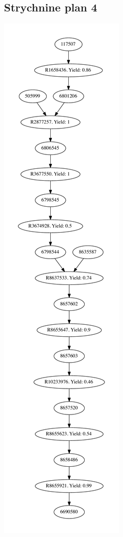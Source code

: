 \documentclass[a4paper,10pt,titlepage]{paper}
\begin{document}
\subsection{Strychnine plan 4}
\centering
\includegraphics[scale=0.4]{Synteseplaner/Strychnine/plan4.pdf}
\label{Appendix::Strychnine4}
\end{document}
